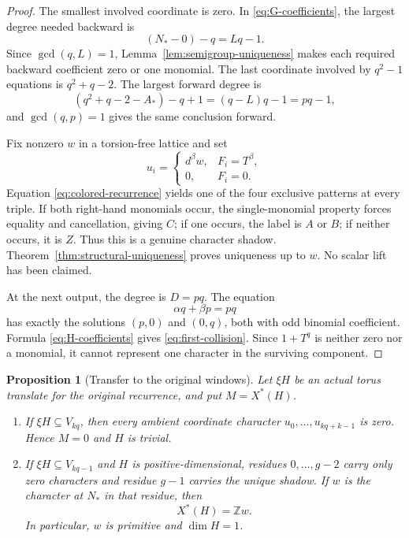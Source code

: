 \documentclass[11pt]{article}
\newcommand{\Z}{\mathbb{Z}}
\newtheorem{proposition}[lemma]{Proposition}
\theoremstyle{remark}
\numberwithin{equation}{section}
\begin{document}
\begin{proof}
The smallest involved coordinate is zero.  In \eqref{eq:G-coefficients}, the largest degree needed backward is
\[
 (N_\ast-0)-q=Lq-1.
\]
Since \(\gcd(q,L)=1\), Lemma~\ref{lem:semigroup-uniqueness} makes each required backward coefficient zero or one monomial.  The last coordinate involved by \(q^2-1\) equations is \(q^2+q-2\).  The largest forward degree is
\[
 (q^2+q-2-A_\ast)-q+1=(q-L)q-1=pq-1,
\]
and \(\gcd(q,p)=1\) gives the same conclusion forward.

Fix nonzero \(w\) in a torsion-free lattice and set
\begin{equation}\label{eq:shadow-characters}
 u_i=\begin{cases}d^\beta w,&F_i=T^\beta,\\0,&F_i=0.\end{cases}
\end{equation}
Equation \eqref{eq:colored-recurrence} yields one of the four exclusive patterns at every triple.  If both right-hand monomials occur, the single-monomial property forces equality and cancellation, giving \(C\); if one occurs, the label is \(A\) or \(B\); if neither occurs, it is \(Z\).  Thus this is a genuine character shadow.  Theorem~\ref{thm:structural-uniqueness} proves uniqueness up to \(w\).  No scalar lift has been claimed.

At the next output, the degree is \(D=pq\).  The equation
\[
 \alpha q+\beta p=pq
\]
has exactly the solutions \((p,0)\) and \((0,q)\), both with odd binomial coefficient.  Formula \eqref{eq:H-coefficients} gives \eqref{eq:first-collision}.  Since \(1+T^q\) is neither zero nor a monomial, it cannot represent one character in the surviving component.
\end{proof}

\begin{proposition}[Transfer to the original windows]\label{prop:original-window}
Let \(\xi H\) be an actual torus translate for the original recurrence, and put \(M=X^\ast(H)\).
\begin{enumerate}
\item If \(\xi H\subseteq V_{kq}\), then every ambient coordinate character
\(u_0,\ldots,u_{kq+k-1}\) is zero.  Hence \(M=0\) and \(H\) is trivial.
\item If \(\xi H\subseteq V_{kq-1}\) and \(H\) is positive-dimensional, residues \(0,\ldots,g-2\) carry only zero characters and residue \(g-1\) carries the unique shadow.  If \(w\) is the character at \(N_\ast\) in that residue, then
\begin{equation}\label{eq:actual-character-lattice}
 X^\ast(H)=\Z w.
\end{equation}
In particular, \(w\) is primitive and \(\dim H=1\).
\end{enumerate}
\end{proposition}
\end{document}
